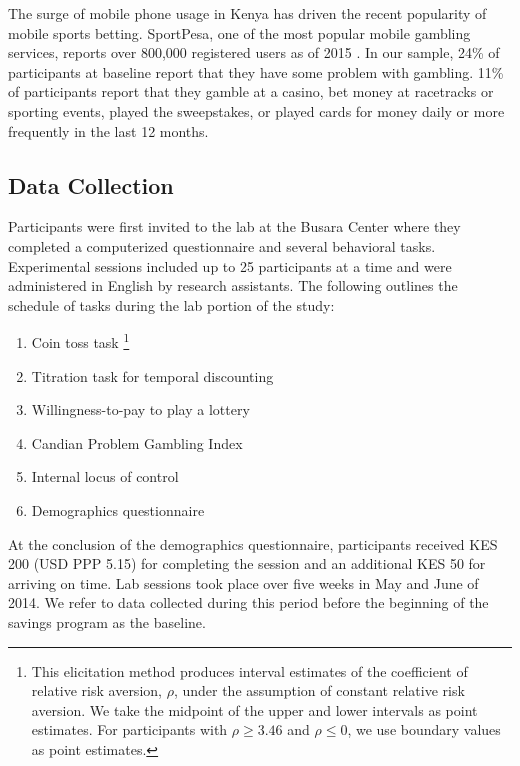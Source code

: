 \documentclass[12pt, titlepage]{article}
\begin{document}
		The surge of mobile phone usage in Kenya has driven the recent popularity of mobile sports betting. SportPesa, one of the most popular mobile gambling services, reports over 800,000 registered users as of 2015 \parencite{kemibaro_sportpesa_2015}. In our sample, 24\% of participants at baseline report that they have some problem with gambling. 11\% of participants report that they gamble at a casino, bet money at racetracks or sporting events, played the sweepstakes, or played cards for money daily or more frequently in the last 12 months.

	\subsection{Data Collection}

		Participants were first invited to the lab at the Busara Center where they completed a computerized questionnaire and several behavioral tasks. Experimental sessions included up to 25 participants at a time and were administered in English by research assistants. The following outlines the schedule of tasks during the lab portion of the study:

		\begin{enumerate} \setlength{\itemsep}{1pt}
		\item Coin toss task \parencite{eckel_sex_2002}\footnote{This elicitation method produces interval estimates of the coefficient of relative risk aversion, $\rho$, under the assumption of constant relative risk aversion. We take the midpoint of the upper and lower intervals as point estimates. For participants with $\rho \geq 3.46$ and $\rho \leq 0$, we use boundary values as point estimates.}
		\item Titration task for temporal discounting \parencite{cornsweet_staircase-method_1962}
		\item Willingness-to-pay to play a lottery
		\item Candian Problem Gambling Index \parencite{ferris_canadian_2001}
		\item Internal locus of control \parencite{rotter_generalized_1966}
		\item Demographics questionnaire
		\end{enumerate}

		At the conclusion of the demographics questionnaire, participants received KES 200 (USD PPP 5.15) for completing the session and an additional KES 50 for arriving on time. Lab sessions took place over five weeks in May and June of 2014. We refer to data collected during this period before the beginning of the savings program as the baseline.
\end{document}
